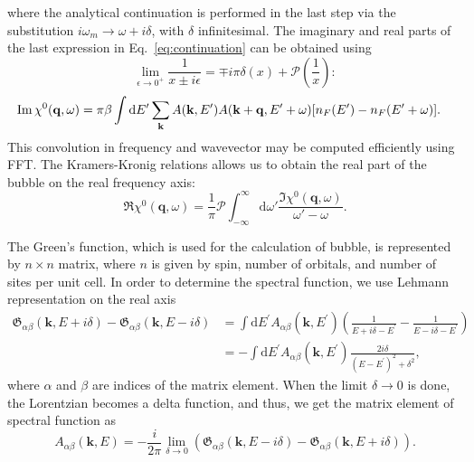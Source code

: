 \documentclass[preprint,prb,amsmath,superscriptaddress,showpacs]{revtex4}
\newcommand{\bk}{\mathbf{k}}
\newcommand{\bq}{\mathbf{q}}
\begin{document}
where the analytical continuation is performed in the last step via the
substitution $i\omega_m \rightarrow \omega + i\delta$, with $\delta$
infinitesimal. The imaginary and real parts of the last expression in
Eq.~\ref{eq:continuation} can be obtained using
%
\begin{equation}
  \lim_{\epsilon \rightarrow 0^{+}} \frac{1}{x \pm i\epsilon} = \mp
  i\pi\delta (x) + \mathcal{P}\left( \frac{1}{x} \right):
\end{equation}
%
\begin{equation}
  \begin{aligned}
    \Im \chi^0(\bq, \omega)
    &= \pi \beta
    \int
    \mathrm{d} E'
    \sum_{\bk} A(\bk, E') 
    A(\bk + \bq, E' + \omega)
    \qty[n_F(E') - n_F(E' + \omega) ].
    \end{aligned}
\end{equation}
This convolution in frequency and wavevector may be computed
efficiently using FFT. The Kramers-Kronig relations allows us
to obtain the real part of the bubble on the real frequency axis:
%
\begin{equation}
  \Re \chi^0(\bq, \omega) =
  \dfrac{1}{\pi} \mathcal{P}
  \int_{-\infty}^{\infty}
  \mathrm{d} \omega' \frac{\Im \chi^0(\bq, \omega)}{\omega' - \omega}.
\end{equation}
%

The Green's function, which is used for the calculation of bubble, is
represented by $n \times n$ matrix, where $n$ is given by spin, number
of orbitals, and number of sites per unit cell. In order to determine the
spectral function, we use Lehmann representation on the real axis
%
\begin{equation}
  \begin{aligned}
    \mathfrak{G_{\alpha\beta}}(\bk, E + i\delta) - \mathfrak{G_{\alpha\beta}}(\bk, E - i\delta) &=
    \int \mathrm{d}E^{\prime} A_{\alpha\beta}(\mathbf{k}, E^{\prime})
  \left(\frac{1}{E + i\delta - E^{\prime}} - \frac{1}{E - i\delta -
      E^{\prime}} \right) \\
  &= -\int \mathrm{d}E^{\prime} A_{\alpha\beta}(\mathbf{k}, E^{\prime})
  \frac{2i\delta}{(E - E^{\prime})^2 + \delta^2},
  \end{aligned}
\end{equation}
%
where $\alpha$ and $\beta$ are indices of the matrix element. When the
limit $\delta \rightarrow 0$ is done, the Lorentzian becomes a delta
function, and thus, we get the matrix
element of spectral function as
%
\begin{equation}
A_{\alpha\beta}(\mathbf{k}, E) = - \frac{i}{2\pi}
  \lim_{\delta\to 0} \left( \mathfrak{G_{\alpha\beta}}(\bk, E -
    i\delta) - \mathfrak{G_{\alpha\beta}}(\bk, E + i\delta) \right).
\end{equation}
\end{document}
